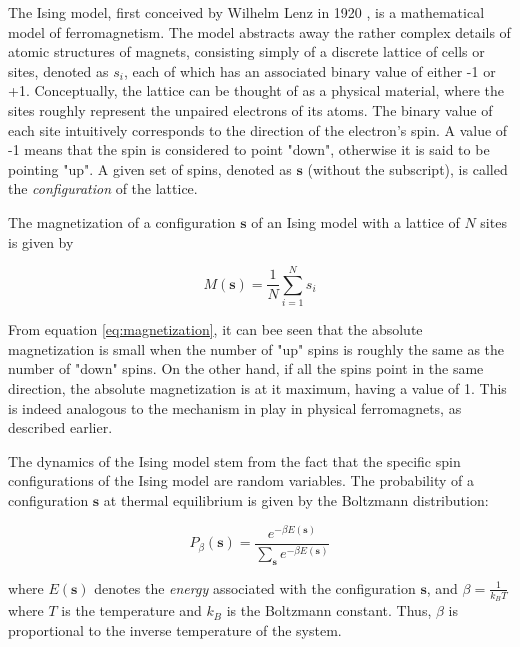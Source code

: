 \documentclass[12pt]{article}
\begin{document}
The Ising model, first conceived by Wilhelm Lenz in 1920 \cite{ising-history}, is a mathematical model of ferromagnetism. The model abstracts away the rather complex details of atomic structures of magnets, consisting simply of a discrete lattice of cells or sites, denoted as $s_i$, each of which has an associated binary value of either -1 or +1. Conceptually, the lattice can be thought of as a physical material, where the sites roughly represent the unpaired electrons of its atoms. The binary value of each site intuitively corresponds to the direction of the electron's spin. A value of -1 means that the spin is considered to point "down", otherwise it is said to be pointing "up". A given set of spins, denoted as $\boldsymbol{s}$ (without the subscript), is called the \textit{configuration} of the lattice. \cite{statistical-mechanics}

The magnetization of a configuration $\boldsymbol{s}$ of an Ising model with a lattice of $N$ sites is given by 

\begin{equation}
M(\boldsymbol{s}) = \frac{1}{N} \sum_{i=1}^N s_i
\label{eq:magnetization}
\end{equation}

From equation \ref{eq:magnetization}, it can bee seen that the absolute magnetization is small when the number of "up" spins is roughly the same as the number of "down" spins. On the other hand, if all the spins point in the same direction, the absolute magnetization is at it maximum, having a value of 1. This is indeed analogous to the mechanism in play in physical ferromagnets, as described earlier. 

The dynamics of the Ising model stem from the fact that the specific spin configurations of the Ising model are random variables. The probability of a configuration $\boldsymbol{s}$ at thermal equilibrium is given by the Boltzmann distribution: 

\begin{equation}
P_\beta(\boldsymbol{s}) = \frac{e^{-\beta E(\boldsymbol{s})}}{\sum_{\boldsymbol{s}} e^{-\beta E(\boldsymbol{s})}}
\label{eq:boltzmann-dist}
\end{equation}

where $E(\boldsymbol{s})$ denotes the \textit{energy} associated with the configuration $\boldsymbol{s}$, and $\beta = \frac{1}{k_B T}$ where $T$ is the temperature and $k_B$ is the Boltzmann constant. Thus, $\beta$ is proportional to the inverse temperature of the system.  
\end{document}

